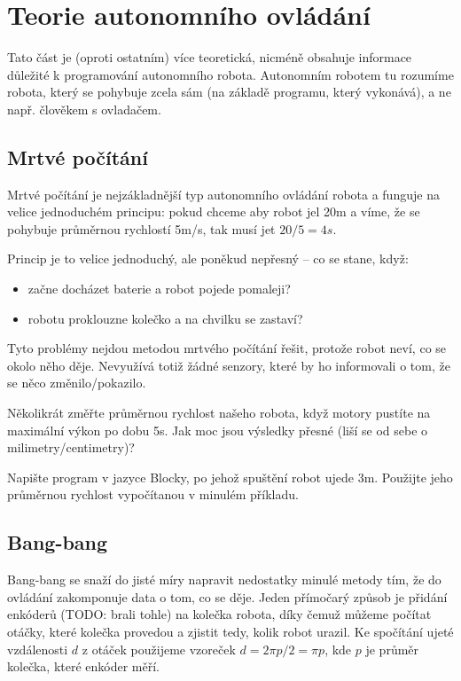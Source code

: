 \documentclass[../main.tex]{subfiles}
\begin{document}
	\section{Teorie autonomního ovládání}

	Tato část je (oproti ostatním) více teoretická, nicméně obsahuje informace důležité k programování autonomního robota. Autonomním robotem tu rozumíme robota, který se pohybuje zcela sám (na základě programu, který vykonává), a ne např. člověkem s ovladačem.

	\subsection{Mrtvé počítání}
	Mrtvé počítání je nejzákladnější typ autonomního ovládání robota a funguje na velice jednoduchém principu: pokud chceme aby robot jel \si{20m} a víme, že se pohybuje průměrnou rychlostí \si{5m/s}, tak musí jet $20 / 5 = \si{4s}$.

	Princip je to velice jednoduchý, ale poněkud nepřesný -- co se stane, když:
	\begin{itemize}
		\item začne docházet baterie a robot pojede pomaleji?
		\item robotu proklouzne kolečko a na chvilku se zastaví?
	\end{itemize}

	Tyto problémy nejdou metodou mrtvého počítání řešit, protože robot neví, co se okolo něho děje. Nevyužívá totiž žádné senzory, které by ho informovali o tom, že se něco změnilo/pokazilo.

	\begin{question}
		Několikrát změřte průměrnou rychlost našeho robota, když motory pustíte na maximální výkon po dobu \si{5s}. Jak moc jsou výsledky přesné (liší se od sebe o milimetry/centimetry)?
	\end{question}

	\begin{question}
		Napište program v jazyce Blocky, po jehož spuštění robot ujede \si{3m}. Použijte jeho průměrnou rychlost vypočítanou v minulém příkladu.
	\end{question}

	\subsection{Bang-bang}
	Bang-bang se snaží do jisté míry napravit nedostatky minulé metody tím, že do ovládání zakomponuje data o tom, co se děje. Jeden přímočarý způsob je přidání enkóderů (TODO: brali tohle) na kolečka robota, díky čemuž můžeme počítat otáčky, které kolečka provedou a zjistit tedy, kolik robot urazil. Ke spočítání ujeté vzdálenosti $d$ z otáček použijeme vzoreček $d = 2 \pi p/2 = \pi p$, kde $p$ je průměr kolečka, které enkóder měří.
\end{document}
